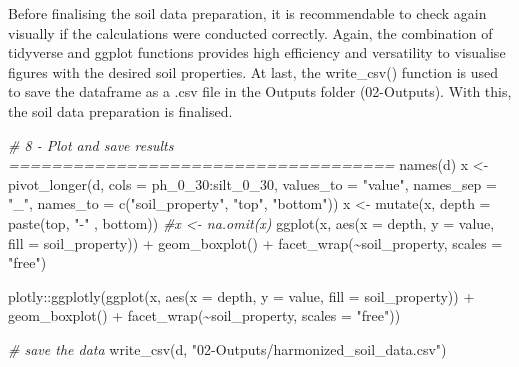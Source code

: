 \documentclass[
  10pt,
  b5paper,
  oneside]{book}
\newenvironment{Shaded}{\begin{snugshade}}{\end{snugshade}}
\newcommand{\AttributeTok}[1]{\textcolor[rgb]{0.77,0.63,0.00}{#1}}
\newcommand{\CommentTok}[1]{\textcolor[rgb]{0.56,0.35,0.01}{\textit{#1}}}
\newcommand{\FunctionTok}[1]{\textcolor[rgb]{0.00,0.00,0.00}{#1}}
\newcommand{\NormalTok}[1]{#1}
\newcommand{\OtherTok}[1]{\textcolor[rgb]{0.56,0.35,0.01}{#1}}
\newcommand{\SpecialCharTok}[1]{\textcolor[rgb]{0.00,0.00,0.00}{#1}}
\newcommand{\StringTok}[1]{\textcolor[rgb]{0.31,0.60,0.02}{#1}}
\begin{document}
Before finalising the soil data preparation, it is recommendable to check again visually if the calculations were conducted correctly. Again, the combination of tidyverse and ggplot functions provides high efficiency and versatility to visualise figures with the desired soil properties. At last, the write\_csv() function is used to save the dataframe as a .csv file in the Outputs folder (02-Outputs). With this, the soil data preparation is finalised.

\begin{Shaded}
\begin{Highlighting}[]
\CommentTok{\# 8 {-} Plot  and save results ====================================}
\FunctionTok{names}\NormalTok{(d)}
\NormalTok{x }\OtherTok{\textless{}{-}} \FunctionTok{pivot\_longer}\NormalTok{(d, }\AttributeTok{cols =}\NormalTok{ ph\_0\_30}\SpecialCharTok{:}\NormalTok{silt\_0\_30, }
                  \AttributeTok{values\_to =} \StringTok{"value"}\NormalTok{,}
                  \AttributeTok{names\_sep =} \StringTok{"\_"}\NormalTok{, }
                  \AttributeTok{names\_to =} \FunctionTok{c}\NormalTok{(}\StringTok{"soil\_property"}\NormalTok{, }\StringTok{"top"}\NormalTok{, }\StringTok{"bottom"}\NormalTok{))}
\NormalTok{x }\OtherTok{\textless{}{-}} \FunctionTok{mutate}\NormalTok{(x, }\AttributeTok{depth =} \FunctionTok{paste}\NormalTok{(top, }\StringTok{"{-}"}\NormalTok{ , bottom))}
\CommentTok{\#x \textless{}{-} na.omit(x)}
\FunctionTok{ggplot}\NormalTok{(x, }\FunctionTok{aes}\NormalTok{(}\AttributeTok{x =}\NormalTok{ depth, }\AttributeTok{y =}\NormalTok{ value, }\AttributeTok{fill =}\NormalTok{ soil\_property)) }\SpecialCharTok{+}
  \FunctionTok{geom\_boxplot}\NormalTok{() }\SpecialCharTok{+} 
  \FunctionTok{facet\_wrap}\NormalTok{(}\SpecialCharTok{\textasciitilde{}}\NormalTok{soil\_property, }\AttributeTok{scales =} \StringTok{"free"}\NormalTok{)}


\NormalTok{plotly}\SpecialCharTok{::}\FunctionTok{ggplotly}\NormalTok{(}\FunctionTok{ggplot}\NormalTok{(x, }\FunctionTok{aes}\NormalTok{(}\AttributeTok{x =}\NormalTok{ depth, }\AttributeTok{y =}\NormalTok{ value, }
                               \AttributeTok{fill =}\NormalTok{ soil\_property)) }\SpecialCharTok{+}
           \FunctionTok{geom\_boxplot}\NormalTok{() }\SpecialCharTok{+} 
           \FunctionTok{facet\_wrap}\NormalTok{(}\SpecialCharTok{\textasciitilde{}}\NormalTok{soil\_property, }\AttributeTok{scales =} \StringTok{"free"}\NormalTok{))}

\CommentTok{\# save the data}
\FunctionTok{write\_csv}\NormalTok{(d, }\StringTok{"02{-}Outputs/harmonized\_soil\_data.csv"}\NormalTok{)}
\end{Highlighting}
\end{Shaded}
\end{document}
